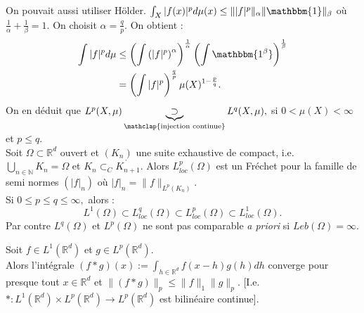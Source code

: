 \begin{remarque}
    On pouvait aussi utiliser Hölder. $\int_X|f(x)| ^pd\mu(x)\le \||f| ^p\|_\alpha  \|\mathbbm{1}\|_\beta$ où $\frac{1}{\alpha }+\frac{1}{\beta}=1$. On choisit $\alpha =\frac{q}{p}.$ On obtient :
    \begin{align*}
        \int |f| ^pd\mu&\le \left( \int\left( |f| ^p \right) ^\alpha  \right) ^{\frac{1}{\alpha }} \left( \int \mathbbm{1^\beta} \right) ^{\frac{1}{\beta}}\\
                       &=\left( \int |f| ^p \right) ^{\frac{q}{p}}\mu(X)^{1-\frac{p}{q}}.
    \end{align*}
    On en déduit que $L^p(X,\mu)\underbrace{\supset}_{\mathclap{\text{injection continue}}}L^q(X,\mu),$ si $0<\mu(X)<\infty $ et $p\le q.$ \\

    Soit $\Omega \subset  \mathbb{R} ^d $ ouvert et $(K_n)$ une suite exhaustive de compact, i.e. $\bigcup\limits_{n\in \mathbb{N} } K_n=\Omega$ et $K_n\subset _C\mathring{K_{n+1}}.$ Alors $L^p_{loc}(\Omega)$ est un Fréchet pour la famille de semi normes $\left( |f| _n \right) $ où $|f| _n=\|f\|_{L^p(K_n)}.$ \\

    Si  $0\le p\le q\le \infty, $ alors :
    $$L^1(\Omega)\subset L^q_{loc}(\Omega)\subset L^p_{loc}(\Omega)\subset L^1_{loc}(\Omega).$$
Par contre $L^q(\Omega)$ et $L^p(\Omega)$ ne sont pas comparable \textit{a priori} si $Leb(\Omega)=\infty $.
\end{remarque}
\begin{propriete}
    Soit $f\in L^1(\mathbb{R} ^d)$ et $g\in L^p(\mathbb{R} ^d).$ \\
    Alors l'intégrale $\left( f*g \right) (x):=\int_{h\in \mathbb{R} ^d}f(x-h)g(h)dh$
    converge pour presque tout $x\in \mathbb{R} ^d$ et $\|\left( f*g \right) \|_p\le \|f\|_1\|g\|_p.$ [I.e. $*:L^1(\mathbb{R} ^d)\times L^p(\mathbb{R} ^d)\to L^p(\mathbb{R} ^d)$ est bilinéaire continue].
\end{propriete}
